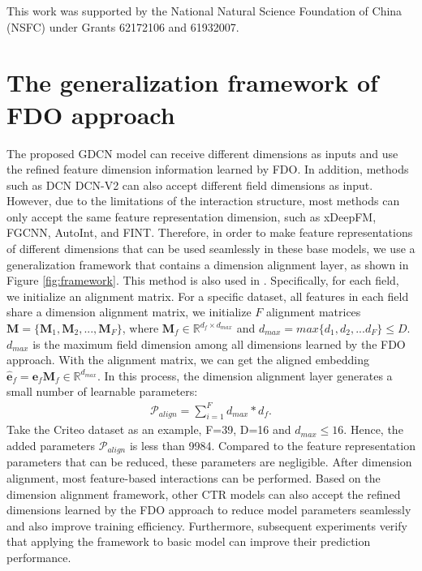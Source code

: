 \documentclass[sigconf]{acmart}
\begin{document}
\begin{acks}
This work was supported by the National Natural Science Foundation of China (NSFC) under Grants 62172106 and 61932007.
\end{acks}

\clearpage

\balance


\clearpage
\appendix
\clearpage{}\section{The generalization framework of FDO approach}
The proposed GDCN model can receive different dimensions as inputs and use the refined feature dimension information learned by FDO. In addition, methods such as DCN DCN-V2 can also accept different field dimensions as input. However, due to the limitations of the interaction structure, most methods can only accept the same feature representation dimension, such as xDeepFM, FGCNN, AutoInt, and FINT. Therefore, in order to make feature representations of different dimensions that can be used seamlessly in these base models, we use a generalization framework that contains a dimension alignment layer, as shown in Figure \ref{fig:framework}. This method is also used in \cite{qu2022sseds, zhao2021autodim}. Specifically, for each field, we initialize an alignment matrix. For a specific dataset, all features in each field share a dimension alignment matrix, we initialize $F$ alignment matrices $\mathbf{M} = \{\mathbf{M}_1, \mathbf{M}_2,...,\mathbf{M}_F\}$, where $\mathbf{M}_f \in \mathbb{R}^{d_{f}\times d_{max}}$ and $d_{max} = max\{d_1, d_2,...d_F\}\leq D$. $d_{max}$ is the maximum field dimension among all dimensions learned by the FDO approach. With the alignment matrix, we can get the aligned embedding $\mathbf{\hat{e}}_f = \mathbf{e}_f\mathbf{M}_f \in \mathbb{R}^{d_{max}}$. In this process, the dimension alignment layer generates a small number of learnable parameters:
\begin{align}
\mathcal{P}_{align} = \sum_{i=1}^{F}{d_{max}}*d_f.
\end{align}
Take the Criteo dataset as an example, F=39, D=16 and $d_{max} \leq 16$. Hence, the added parameters $\mathcal{P}_{align}$ is less than 9984. Compared to the feature representation parameters that can be reduced, these parameters are negligible. After dimension alignment, most feature-based interactions can be performed. Based on the dimension alignment framework, other CTR models can also accept the refined dimensions learned by the FDO approach to reduce model parameters seamlessly and also improve training efficiency. Furthermore, subsequent experiments verify that applying the framework to basic model can improve their prediction performance.
\end{document}
